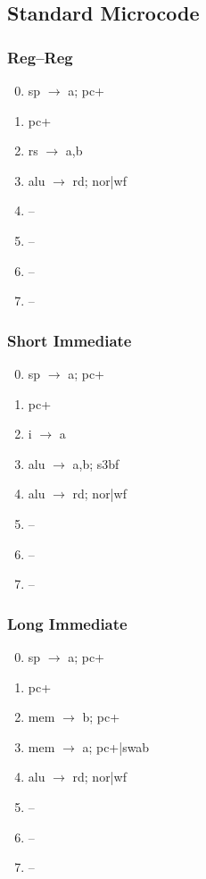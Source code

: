 \documentclass[11pt]{book}
\begin{document}
\subsection*{Standard Microcode}
\begin{multicols}{3}\ttfamily\selectfont\small
  \subsubsection*{Reg--Reg}
  \begin{enumerate}\setcounter{enumi}{-1}
  \item sp \(\rightarrow\) a; pc+
  \item pc+
  \item rs \(\rightarrow\) a,b
  \item alu \(\rightarrow\) rd; nor|wf
  \item --
  \item --
  \item --
  \item --
  \end{enumerate}
  \columnbreak
  \subsubsection*{Short Immediate}
  \begin{enumerate}\setcounter{enumi}{-1}
  \item sp \(\rightarrow\) a; pc+
  \item pc+
  \item i \(\rightarrow\) a
  \item alu \(\rightarrow\) a,b; s3bf
  \item alu \(\rightarrow\) rd; nor|wf
  \item --
  \item --
  \item --
  \end{enumerate}
  \columnbreak
  \subsubsection*{Long Immediate}
  \begin{enumerate}\setcounter{enumi}{-1}
  \item sp \(\rightarrow\) a; pc+
  \item pc+
  \item mem \(\rightarrow\) b; pc+
  \item mem \(\rightarrow\) a; pc+|swab
  \item alu \(\rightarrow\) rd; nor|wf
  \item --
  \item --
  \item --
  \end{enumerate}
\end{multicols}
\end{document}
